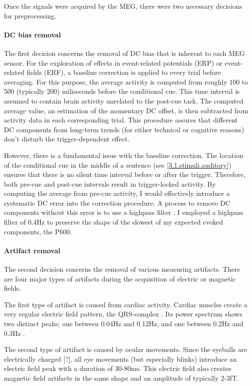 Once the signals were acquired by the MEG, there were two necessary decisions for preprocessing.

\paragraph{DC bias removal}
The first decision concerns the removal of DC bias that is inherent to each MEG sensor.
For the exploration of effects in event-related potentials (ERP) or event-related fields (ERF), a baseline correction is applied to every trial before averaging.
For this purpose, the average activity is computed from roughly 100 to 500 (typically 200) miliseconds before the conditional cue.
This time interval is assumed to contain brain activity unrelated to the post-cue task.
The computed average value, an estimation of the momentary DC offset, is then subtracted from activity data in each corresponding trial.
This procedure assures that different DC components from long-term trends (for either technical or cognitive reasons) don't disturb the trigger-dependent effect.

However, there is a fundamental issue with the baseline correction.
The location of the conditional cue in the middle of a sentence (see \ref{3.1.stimuli.auditory}) ensures that there is no silent time interval before or after the trigger.
Therefore, both pre-cue and post-cue intervals result in trigger-locked activity.
By computing the average from pre-cue activity, I would effectively introduce a systematic DC error into the correction procedure.
A process to remove DC components without this error is to use a highpass filter \cite{1.5.highpass}.
I employed a highpass filter of 0.4Hz to preserve the shape of the slowest of my expected evoked components, the P600.

\paragraph{Artifact removal}
The second decision concerns the removal of various measuring artifacts.
There are four major types of artifacts during the acquisition of electric or magnetic fields.

The first type of artifact is caused from cardiac activity.
Cardiac muscles create a very regular electric field pattern, the QRS-complex \cite{1.5.ecg.a}.
Its power spectrum shows two distinct peaks; one between 0.04Hz and 0.12Hz, and one between 0.2Hz and 0.3Hz \cite{1.5.ecg.b}.

The second type of artifact is caused by ocular movements.
Since the eyeballs are electrically charged [?], all eye movements (but especially blinks) introduce an electric field peak with a duration of 30-80ms. This electric field also creates magnetic field artifacts in the same shape and an amplitude of typically 2-3fT.


